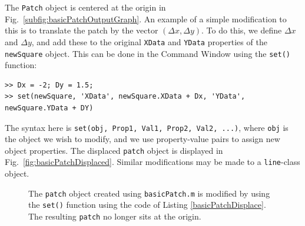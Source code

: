 The \texttt{Patch} object is centered at the origin in Fig.\ \ref{subfig:basicPatchOutputGraph}. An example of a simple modification to this is to translate the patch by the vector $(\Delta x, \Delta y)$. To do this, we define $\Delta x$ and $\Delta y$, and add these to the original \texttt{XData} and \texttt{YData} properties of the \texttt{newSquare} object. This can be done in the Command Window using the \texttt{set()} function:
\begin{lstlisting}[style=Matlab-editor,label=basicPatchDisplace,caption={A Command Window modification to the \texttt{patch} defined in Listing \ref{basicPatch}. Line 1 is used to specify the $x$- and $y$-components of the displacement. The displacement is then applied to the original \texttt{XData} and \texttt{YData} properties, and the result of the addition is the value component of a property-value pair in the \texttt{set()} function.}]
>> Dx = -2; Dy = 1.5;
>> set(newSquare, 'XData', newSquare.XData + Dx, 'YData', newSquare.YData + DY)
\end{lstlisting}
The syntax here is \verb!set(obj, Prop1, Val1, Prop2, Val2, ...)!, where \texttt{obj} is the object we wish to modify, and we use property-value pairs to assign new object properties. The displaced \texttt{patch} object is displayed in Fig.\ \ref{fig:basicPatchDisplaced}. Similar modifications may be made to a \texttt{line}-class object.

\begin{figure}[htbp] %
   \centering
      \caption{The \texttt{patch} object created using \texttt{basicPatch.m} is modified by using the \texttt{set()} function using the code of Listing \ref{basicPatchDisplace}. The resulting \texttt{patch} no longer sits at the origin.}

\end{figure}

